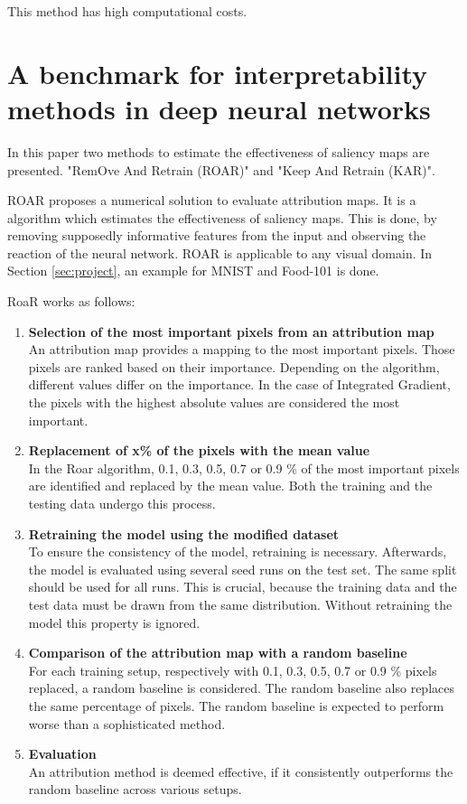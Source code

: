 This method has high computational costs.

\section{A benchmark for interpretability methods in deep neural networks \cite{hooker2019benchmark}}

In this paper two methods to estimate the effectiveness of saliency maps are presented. "RemOve And Retrain (ROAR)" and "Keep And Retrain (KAR)". 

ROAR proposes a numerical solution to evaluate attribution maps. It is a algorithm which estimates the effectiveness of saliency maps. This is done, by removing supposedly informative features from the input and observing the reaction of the neural network. ROAR is applicable to any visual domain. In Section \ref{sec:project}, an example for MNIST and Food-101 is done.


RoaR  works as follows:
\begin{enumerate}
	\item \textbf{ Selection of the most important pixels from an attribution map}\\
	An attribution map provides a mapping to the most important pixels. Those pixels are ranked based on their importance. Depending on the algorithm, different values differ on the importance. In the case of Integrated Gradient, the pixels with the highest absolute values are considered the most important.
	\item \textbf{ Replacement of x\% of the pixels with the mean value}\\
	In the Roar algorithm, 0.1, 0.3, 0.5, 0.7 or 0.9 \% of the most important pixels are identified and replaced by the mean value. Both the training and the testing data undergo this process.
	\item \textbf{ Retraining the model using the modified dataset}\\
	To ensure the consistency of the model, retraining is necessary. Afterwards, the model is evaluated using several seed runs on the test set. The same split should be used for all runs.
	This is crucial, because the training data and the test data must be drawn from the same distribution. Without retraining the model this property is ignored.
	\item \textbf{ Comparison of the attribution map with a random baseline} \\
	For each training setup, respectively with 0.1, 0.3, 0.5, 0.7 or 0.9 \% pixels replaced, a random baseline is considered. The random baseline also replaces the same percentage of pixels. The random baseline is expected to perform worse than a sophisticated method.
	\item \textbf{ Evaluation} \\
	An attribution method is deemed effective, if it consistently outperforms the random baseline across various setups.
\end{enumerate}

